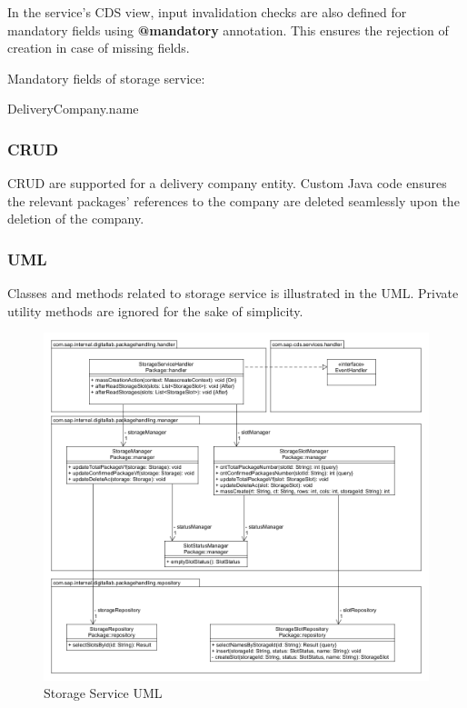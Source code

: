\bigskip
In the service's CDS view, input invalidation checks are also defined for mandatory fields using \textbf{@mandatory} annotation. This ensures the rejection of creation in case of missing fields. 

\bigskip
Mandatory fields of storage service:
\begin{compactenum}
	\item DeliveryCompany.name
\end{compactenum}

\subsubsection{CRUD}
CRUD are supported for a delivery company entity. Custom Java code ensures the relevant packages' references to the company are deleted seamlessly upon the deletion of the company.

\subsubsection{UML}

Classes and methods related to storage service is illustrated in the UML. Private utility methods are ignored for the sake of simplicity.
\begin{figure}
    \centering
    \includegraphics[width=1\linewidth]{images/service_class_diagrams/storage_service_class_diagram.png}
    \caption{Storage Service UML}
    \label{fig:storage_service_uml}
\end{figure}

